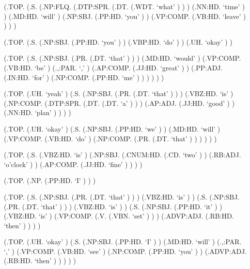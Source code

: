 \documentclass[10pt]{article}
\begin{document}
\begin{parsetree}  (.TOP. (.S. (.NP:FLQ. (.DTP:SPR. (.DT. (.WDT. `what' ) ) ) (.NN:HD. `time' ) ) (.MD:HD. `will' ) (.NP:SBJ. (.PP:HD. `you' ) ) (.VP:COMP. (.VB:HD. `leave' ) ) ) ) \end{parsetree}

\begin{parsetree}  (.TOP. (.S. (.NP:SBJ. (.PP:HD. `you' ) ) (.VBP:HD. `do' ) ) (.UH. `okay' ) ) \end{parsetree}

\begin{parsetree}  (.TOP. (.S. (.NP:SBJ. (.PR. (.DT. `that' ) ) ) (.MD:HD. `would' ) (.VP:COMP. (.VB:HD. `be' ) (.,:PAR. `,' ) (.AP:COMP. (.JJ:HD. `great' ) ) (.PP:ADJ. (.IN:HD. `for' ) (.NP:COMP. (.PP:HD. `me' ) ) ) ) ) ) \end{parsetree}

\begin{parsetree}  (.TOP. (.UH. `yeah' ) (.S. (.NP:SBJ. (.PR. (.DT. `that' ) ) ) (.VBZ:HD. `is' ) (.NP:COMP. (.DTP:SPR. (.DT. (.DT. `a' ) ) ) (.AP:ADJ. (.JJ:HD. `good' ) ) (.NN:HD. `plan' ) ) ) ) \end{parsetree}

\begin{parsetree}  (.TOP. (.UH. `okay' ) (.S. (.NP:SBJ. (.PP:HD. `we' ) ) (.MD:HD. `will' ) (.VP:COMP. (.VB:HD. `do' ) (.NP:COMP. (.PR. (.DT. `that' ) ) ) ) ) ) \end{parsetree}

\begin{parsetree}  (.TOP. (.S. (.VBZ:HD. `is' ) (.NP:SBJ. (.CNUM:HD. (.CD. `two' ) ) (.RB:ADJ. `o'clock' ) ) (.AP:COMP. (.JJ:HD. `fine' ) ) ) ) \end{parsetree}

\begin{parsetree}  (.TOP. (.NP. (.PP:HD. `I' ) ) ) \end{parsetree}

\begin{parsetree}  (.TOP. (.S. (.NP:SBJ. (.PR. (.DT. `that' ) ) ) (.VBZ:HD. `is' ) ) (.S. (.NP:SBJ. (.PR. (.DT. `that' ) ) ) (.VBZ:HD. `is' ) ) (.S. (.NP:SBJ. (.PP:HD. `it' ) ) (.VBZ:HD. `is' ) (.VP:COMP. (.V. (.VBN. `set' ) ) ) (.ADVP:ADJ. (.RB:HD. `then' ) ) ) ) \end{parsetree}

\begin{parsetree}  (.TOP. (.UH. `okay' ) (.S. (.NP:SBJ. (.PP:HD. `I' ) ) (.MD:HD. `will' ) (.,:PAR. `,' ) (.VP:COMP. (.VB:HD. `see' ) (.NP:COMP. (.PP:HD. `you' ) ) (.ADVP:ADJ. (.RB:HD. `then' ) ) ) ) ) \end{parsetree}
\end{document}
